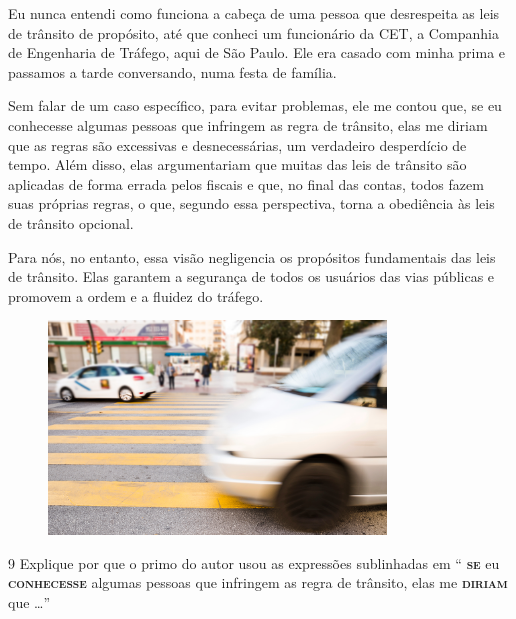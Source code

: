 \begin{myquote}
Eu nunca entendi como funciona a cabeça de uma pessoa que desrespeita as leis
de trânsito de propósito, até que conheci um funcionário da CET, a Companhia
de Engenharia de Tráfego, aqui de São Paulo. Ele era casado com minha prima e
passamos a tarde conversando, numa festa de família. 

Sem falar de um caso específico, para evitar problemas, ele me contou que, se
eu conhecesse algumas pessoas que infringem as regra de trânsito,
elas me diriam que as regras são excessivas e desnecessárias, um
verdadeiro desperdício de tempo. Além disso, elas argumentariam que muitas das
leis de trânsito são aplicadas de forma errada pelos fiscais e que, no final
das contas, todos fazem suas próprias regras, o que, segundo essa perspectiva,
torna a obediência às leis de trânsito opcional.

Para nós, no entanto, essa visão negligencia os propósitos fundamentais das leis 
de trânsito. Elas garantem a segurança de todos os usuários das vias públicas e 
promovem a ordem e a fluidez do tráfego.


\begin{figure}[H]
\centering
\includegraphics[width=0.8\textwidth]{./imgSAEB_7_POR/media/image50.png}
\end{figure}

\end{myquote}

\num{9} Explique por que o primo do autor usou as expressões sublinhadas em  
`` \textsc{\textbf{se}} eu \textsc{\textbf{conhecesse}} algumas pessoas que 
infringem as regra de trânsito, elas me \textsc{\textbf{diriam}} que \ldots{}''

